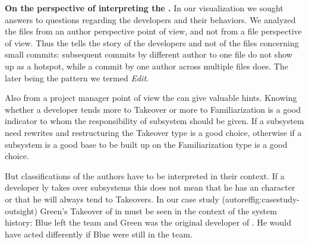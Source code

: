 \textbf{On the perspective of interpreting the \omap.} In our visualization we sought answers to questions regarding the developers and their behaviors. We analyzed the files from an author perspective point of view, and not from a file perspective of view. Thus the \omap tells the story of the developers and not of the files \eg concerning small commits: subsequent commits by different author to one file do not show up as a hotspot, while a commit by one author across multiple files does. The later being the pattern we termed \textit{Edit}.

Also from a project manager point of view the \omap can give valuable hints. Knowing whether a developer tends more to  Takeover or more to Familiarization is a good indicator to whom the responsibility of subsystem should be given. If a subsystem need rewrites and restructuring the Takeover type is a good choice, otherwise if a subsystem is a good base to be built up on the Familiarization type is a good choice.

But classifications of the authors have to be interpreted in their context. If a developer ly takes over subsystems this does not mean that he has an  character or that he will always tend to Takeovers. In our case study (autoref{fig:casestudy-outsight}) Green's Takeover of  in  must be seen in the context of the system history: Blue left the team and Green was the original developer of . He would have acted differently if Blue were still in the team.

%
%
%

